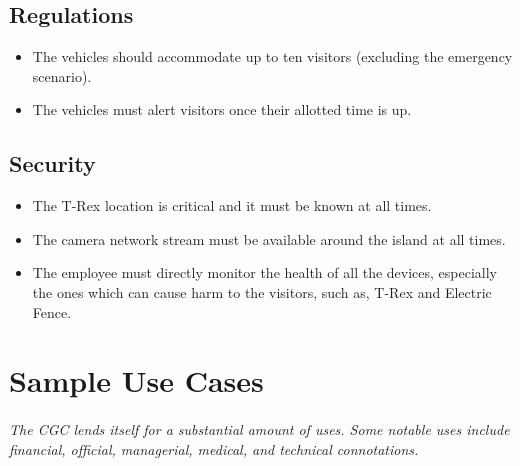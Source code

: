 \documentclass[12pt]{article}
\begin{document}
    \subsection{Regulations}
    \begin{itemize}
        \item The vehicles should accommodate up to ten visitors (excluding the emergency scenario).
        \item The vehicles must alert visitors once their allotted time is up. 
    \end{itemize}

    \subsection{Security}
    \begin{itemize}
        \item The T-Rex location is critical and it must be known at all times.
        \item The camera network stream must be available around the island at all times.
        \item The employee must directly monitor the health of all the devices, especially the ones which can cause harm to the visitors, such as, T-Rex and Electric Fence. 
    \end{itemize}

\section{Sample Use Cases}
\paragraph{} \textit{The CGC lends itself for a substantial amount of uses. Some notable uses include financial,
official, managerial, medical, and technical connotations.}
\end{document}
